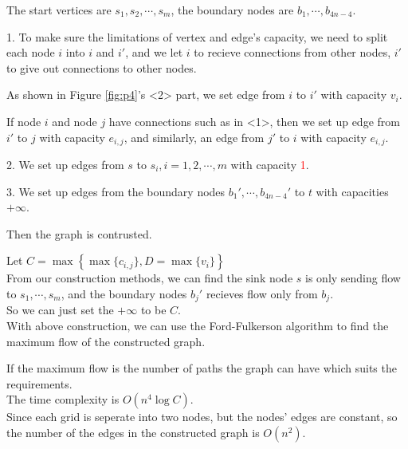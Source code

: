 The start vertices are $s_1,s_2,\cdots,s_m$, the boundary nodes are $b_1,\cdots,b_{4n-4}$.

1. To make sure the limitations of vertex and edge's capacity, we need to split each node $i$ into $i$ and $i'$, and we let $i$ to recieve connections from other nodes, $i'$ to give out connections to other nodes.

As shown in Figure \ref{fig:p4}'s <2> part, we set edge from $i$ to $i'$ with capacity $v_i$.

If node $i$ and node $j$ have connections such as in <1>, then we set up edge from $i'$ to $j$ with capacity $e_{i,j}$, and similarly, an edge from $j'$ to $i$ with capacity $e_{i,j}$.

2. We set up edges from $s$ to $s_i, i=1,2,\cdots,m$ with capacity \textcolor{red}{1}.

3. We set up edges from the boundary nodes $b_1',\cdots,b_{4n-4}'$ to $t$ with capacities $+\infty$.

Then the graph is contrusted.

Let $C=\max\left\{\max\{c_{i,j}\},D=\max\{v_i\}\right\}$\\
From our construction methods, we can find the sink node $s$ is only sending flow to $s_1,\cdots,s_m$,
and the boundary nodes $b_j'$ recieves flow only from $b_j$.\\
So we can just set the $+\infty$ to be $C$.\\

With above construction, we can use the Ford-Fulkerson algorithm to find the maximum flow of the constructed graph.

If the maximum flow is the number of paths the graph can have which suits the requirements.\\
The time complexity is $O(n^4\log C)$.\\
Since each grid is seperate into two nodes, but the nodes' edges are constant, so the number of the edges in the constructed graph is $O(n^2)$.\\

\newpage